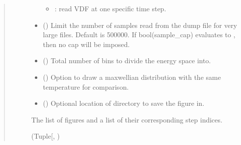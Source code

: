 \documentclass[letterpaper,10pt,english,openany,oneside]{sphinxmanual}
\begin{document}
\begin{fulllineitems}
\begin{fulllineitems}
\begin{quote}
\begin{description}
\begin{itemize}
\begin{itemize}
\item {} 
\sphinxAtStartPar
{}: read VDF at one specific time step.

\end{itemize}


\item {} 
\sphinxAtStartPar
{} () \textendash{} Limit the number of samples read from the dump
file for very large files. Default is 500000. If bool(sample\_cap)
evaluates to , then no cap will be imposed.

\item {} 
\sphinxAtStartPar
{} () \textendash{} Total number of bins to divide the energy space into.

\item {} 
\sphinxAtStartPar
{} () \textendash{} Option to draw a maxwellian distribution
with the same temperature for comparison.

\item {} 
\sphinxAtStartPar
{} () \textendash{} Optional location of directory to save the figure in.

\end{itemize}

\sphinxAtStartPar
The list of
figures and a list of their corresponding step indices.

\sphinxAtStartPar
(Tuple{[}\sphinxhref{https://docs.python.org/3/library/stdtypes.html\#list}{list}{[}\sphinxhref{https://matplotlib.org/stable/api/figure\_api.html\#matplotlib.figure.Figure}{matplotlib.figure.Figure}{]}, \sphinxhref{https://docs.python.org/3/library/stdtypes.html\#list}{list}{[}\sphinxhref{https://docs.python.org/3/library/functions.html\#int}{int}{]})

\end{description}\end{quote}


\end{fulllineitems}
\end{fulllineitems}
\end{document}
